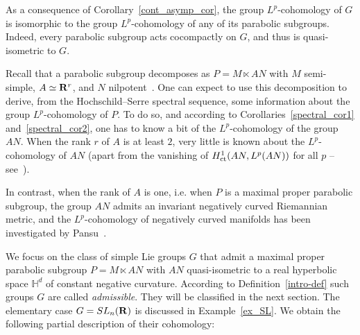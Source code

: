 \documentclass[11pt]{article}
\theoremstyle{definition}
\numberwithin{equation}{section}
\numberwithin{figure}{section}
\numberwithin{table}{section}
\DeclareMathOperator{\ct}{ct}
\begin{document}
As a consequence of Corollary~\ref{cont_asymp_cor}, the group $L^p$-cohomology of $G$ is isomorphic to the group $L^p$-cohomology of any of its parabolic subgroups. Indeed, every parabolic subgroup acts cocompactly on $G$, and thus is quasi-isometric to $G$.

Recall that a parabolic subgroup decomposes as $P = M \ltimes AN$ with $M$ semi-simple, $A \simeq {\bf R} ^r$, and $N$ nilpotent~\cite[Proposition~7.83]{Knapp}. One can expect to use this decomposition to derive, from the Hochschild--Serre spectral sequence, some information about the group $L^p$-cohomology of $P$. To do so, and according to Corollaries~\ref{spectral_cor1} and~\ref{spectral_cor2}, one has to know a bit of the $L^p$-cohomology of the group $AN$. When the rank $r$ of $A$ is at least $2$, very little is known about the $L^p$-cohomology of $AN$ (apart from the vanishing of ${\rm H}^1 _{\ct} (AN, L^p(AN))$ for all $p$ -- see~\cite{CT,P2}).

In contrast, when the rank of $A$ is one, i.e. when $P$ is a maximal proper parabolic subgroup, the group $AN$ admits an invariant negatively curved Riemannian metric, and the $L^p$-cohomology of negatively curved manifolds has been investigated by Pansu~\cite{P1,Pa99}.

We focus on the class of simple Lie groups $G$ that admit a maximal proper parabolic subgroup $P = M \ltimes AN$ with $AN$ quasi-isometric to a real hyperbolic space $\mathbb H^d$ of constant negative curvature. According to Definition~\ref{intro-def} such groups $G$ are called \emph{admissible}. They will be classified in the next section. The elementary case \linebreak$G = {\rm SL}_n({\bf R})$ is discussed in Example~\ref{ex_SL}. We obtain the following partial description of their cohomology:
\end{document}
